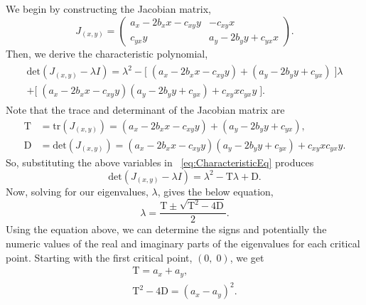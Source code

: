 We begin by constructing the Jacobian matrix,
\begin{equation}\label{eq:Jacobian}
    J_{(x,y)} =
    \begin{pmatrix}
        a_x - 2b_xx -c_{xy}y & -c_{xy}x\\
        c_{yx}y & a_y - 2b_yy + c_{yx}x
    \end{pmatrix}.
\end{equation}
Then, we derive the characteristic polynomial,
\begin{align}
\begin{split}\label{eq:CharacteristicEq}\displaystyle
    \text{det}(J_{(x,y)}-\lambda I) = \lambda^2 - \pmb{\big[}\; (a_x - 2b_xx -c_{xy}y) + (a_y - 2b_yy + c_{yx})\;\pmb{\big]}\lambda\\
    + \pmb{\big[}\; (a_x - 2b_xx -c_{xy}y)(a_y - 2b_yy + c_{yx}) + c_{xy}xc_{yx}y\;\pmb{\big]}.
\end{split}
\end{align}
Note that the trace and determinant of the Jacobian matrix are
\begin{equation*}
    \begin{array}{ll}
         \mathrm{T} &= \text{tr}(J_{(x,y)}) = (a_x - 2b_xx -c_{xy}y) + (a_y - 2b_yy + c_{yx}),
         \\
         \mathrm{D} &= \text{det}(J_{(x,y)}) = (a_x - 2b_xx -c_{xy}y)(a_y - 2b_yy + c_{yx}) + c_{xy}xc_{yx}y.
    \end{array}
\end{equation*}
So, substituting the above variables in \equationautorefname~\eqref{eq:CharacteristicEq} produces
\begin{equation*}
    \text{det}(J_{(x,y)}-\lambda I) = \lambda^2 - \mathrm{T}\lambda + \mathrm{D}.
\end{equation*}
Now, solving for our eigenvalues, $\lambda$, gives the below equation,
\begin{equation*}
    \lambda = \frac{\mathrm{T} \pm \sqrt{\mathrm{T}^2 - 4\mathrm{D}}}{2}.
\end{equation*}
Using the equation above, we can determine the signs and potentially the numeric values of the real and imaginary parts of the eigenvalues for each critical point.
Starting with the first critical point, $(0,\;0)$, we get
\begin{equation*}
    \begin{array}{l}
         \mathrm{T}= a_x+a_y, \\
         \mathrm{T}^2 - 4\mathrm{D}= (a_x-a_y)^2 .
    \end{array}
\end{equation*}
